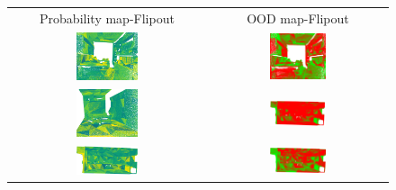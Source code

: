         \begin{figure}[h!]
            \centering
            \begin{tabular}{cc}
                Probability map-Flipout & OOD map-Flipout \\
                \includegraphics[width=0.33\textwidth, height=0.18\textheight]{images/ood_imgs/fout_s3dis/ofc_3_fout_prob.png}& 
                \includegraphics[width=0.33\textwidth, height=0.18\textheight]{images/ood_imgs/fout_s3dis/fout_prob_2.png}\\
    
                \includegraphics[width=0.33\textwidth, height=0.18\textheight]{images/ood_imgs/fout_s3dis/cf1_fout_prob.png}& 
                \includegraphics[width=0.33\textwidth, height=0.18\textheight]{images/ood_imgs/fout_s3dis/fout_prob_4.png}\\
    
                \includegraphics[width=0.33\textwidth, height=0.18\textheight]{images/ood_imgs/fout_s3dis/pnt_1_fout_prob.png}& 
                \includegraphics[width=0.33\textwidth, height=0.18\textheight]{images/ood_imgs/fout_s3dis/fout_prob_3.png}\\
    

\end{tabular}
\end{figure}
